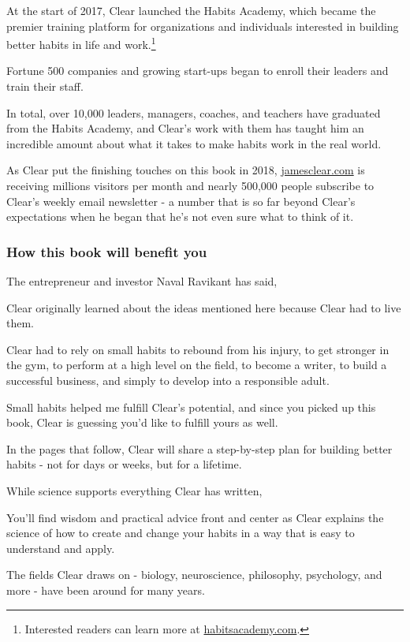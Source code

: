 \documentclass[oneside]{article}
\numberwithin{equation}{section}
\begin{document}
%
At the start of 2017, Clear launched the Habits Academy, which became the premier training platform for organizations and individuals interested in building better habits in life and work.\footnote{Interested readers can learn more at \url{habitsacademy.com}.}

Fortune 500 companies and growing start-ups began to enroll their leaders and train their staff.

In total, over 10,000 leaders, managers, coaches, and teachers have graduated from the Habits Academy, and Clear's work with them has taught him an incredible amount about what it takes to make habits work in the real world.

%
As Clear put the finishing touches on this book in 2018, \url{jamesclear.com} is receiving millions visitors per month and nearly 500,000 people subscribe to Clear's weekly email newsletter - a number that is so far beyond Clear's expectations when he began that he's not even sure what to think of it.

\subsubsection*{How this book will benefit you}
The entrepreneur and investor Naval Ravikant has said, 

Clear originally learned about the ideas mentioned here because Clear had to live them.

Clear had to rely on small habits to rebound from his injury, to get stronger in the gym, to perform at a high level on the field, to become a writer, to build a successful business, and simply to develop into a responsible adult.

Small habits helped me fulfill Clear's potential, and since you picked up this book, Clear is guessing you'd like to fulfill yours as well.

%
In the pages that follow, Clear will share a step-by-step plan for building better habits - not for days or weeks, but for a lifetime.

While science supports everything Clear has written, 

You'll find wisdom and practical advice front and center as Clear explains the science of how to create and change your habits in a way that is easy to understand and apply.

%
The fields Clear draws on - biology, neuroscience, philosophy, psychology, and more - have been around for many years.
\end{document}
